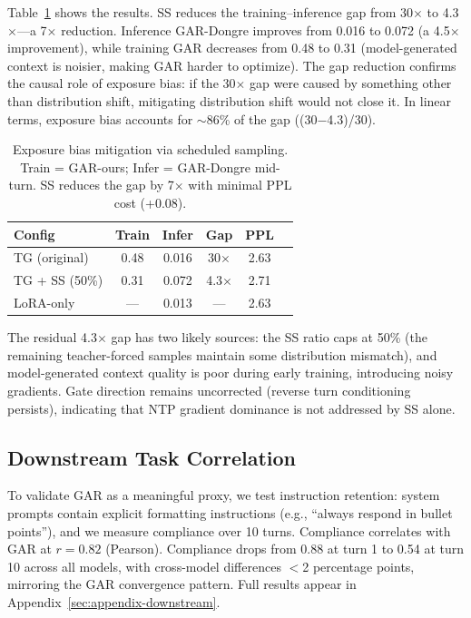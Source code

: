 \documentclass[11pt]{article}
\begin{document}
Table~\ref{tab:mitigation} shows the results. SS reduces the training--inference gap from 30$\times$ to 4.3$\times$---a 7$\times$ reduction. Inference GAR-Dongre improves from 0.016 to 0.072 (a 4.5$\times$ improvement), while training GAR decreases from 0.48 to 0.31 (model-generated context is noisier, making GAR harder to optimize). The gap reduction confirms the causal role of exposure bias: if the 30$\times$ gap were caused by something other than distribution shift, mitigating distribution shift would not close it. In linear terms, exposure bias accounts for $\sim$86\% of the gap ((30$-$4.3)/30).

\begin{table}[t]
\centering
\small
\begin{tabular}{lccccc}
\toprule
\textbf{Config} & \textbf{Train} & \textbf{Infer} & \textbf{Gap} & \textbf{PPL} \\
\midrule
TG (original) & 0.48 & 0.016 & 30$\times$ & 2.63 \\
TG + SS (50\%) & 0.31 & 0.072 & 4.3$\times$ & 2.71 \\
LoRA-only & --- & 0.013 & --- & 2.63 \\
\bottomrule
\end{tabular}
\caption{Exposure bias mitigation via scheduled sampling. Train = GAR-ours; Infer = GAR-Dongre mid-turn. SS reduces the gap by 7$\times$ with minimal PPL cost (+0.08).}
\label{tab:mitigation}
\end{table}

The residual 4.3$\times$ gap has two likely sources: the SS ratio caps at 50\% (the remaining teacher-forced samples maintain some distribution mismatch), and model-generated context quality is poor during early training, introducing noisy gradients. Gate direction remains uncorrected (reverse turn conditioning persists), indicating that NTP gradient dominance is not addressed by SS alone.

\subsection{Downstream Task Correlation}

To validate GAR as a meaningful proxy, we test instruction retention: system prompts contain explicit formatting instructions (e.g., ``always respond in bullet points''), and we measure compliance over 10 turns. Compliance correlates with GAR at $r = 0.82$ (Pearson). Compliance drops from 0.88 at turn 1 to 0.54 at turn 10 across all models, with cross-model differences $<$2 percentage points, mirroring the GAR convergence pattern. Full results appear in Appendix~\ref{sec:appendix-downstream}.
\end{document}
